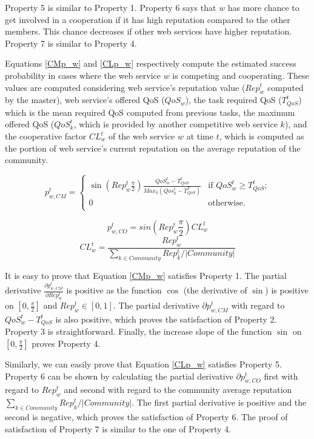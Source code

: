 \documentclass[runningheads,a4paper]{llncs}
\begin{document}
\noindent Property 5 is similar to Property 1. Property 6 says
that $w$ has more chance to get involved in a cooperation if it
has high reputation compared to the other members. This chance
decreases if other web services have higher reputation. Property 7
is similar to Property 4.

Equations  \ref{CMp_w} and \ref{CLp_w} respectively compute the
estimated success probability in cases where the web service $w$
is competing and cooperating. These values are computed
considering web service's reputation value ($Rep^t_w$ computed by
the master), web service's offered QoS ($QoS_w$), the task
required QoS ($T_{QoS}^t$) which is the mean required QoS computed
from previous tasks, the maximum offered QoS ($QoS_k^t$, which is
provided by another competitive web service $k$), and the
cooperative factor $CL_w^t$ of the web service $w$ at time $t$,
which is computed as the portion of web service's current
reputation on the average reputation of the community.

\begin{equation} \label{CMp_w}
p_{w,CM}^t = \begin{cases}
\sin(Rep^t_w\frac{\pi}{2})\frac{QoS_w^t-T_{QoS}^t}{Max_k(Qos_k^t-T_{QoS}^T)} & \text{if $QoS_w^t\geq T_{QoS}^t$;}\\
0 & \text{otherwise.}\\
\end{cases}
\end{equation}

\begin{equation}\label{CLp_w}
p_{w,CO}^t=sin(Rep^t_w\frac{\pi}{2})CL_w^t
\end{equation}
\begin{equation*}
CL_w^t=\frac{Rep^t_w}{\sum_{k\in Community}Rep^t_k/|Community|}
\end{equation*}



It is easy to prove that Equation  \ref{CMp_w} satisfies Property
1. The partial derivative $\frac{\partial p_{w,CM}^t}{\partial
Rep^t_w}$ is positive as the function $\cos$ (the derivative of
$\sin$) is positive on $[0, \frac{\pi}{2}]$ and $Rep^t_w \in [0,
1]$. The partial derivative $\partial p_{w,CM}^t$ with regard to
$QoS_w^t - T_{QoS}^t$ is also positive, which proves the
satisfaction of Property 2. Property 3 is straightforward.
Finally, the increase slope of the function $\sin$ on $[0,
\frac{\pi}{2}]$ proves Property 4.

Similarly, we can easily prove that Equation \ref{CLp_w} satisfies
Property 5. Property 6 can be shown by calculating the partial
derivative $\partial p_{w,CO}^t$ first with regard to $Rep^t_w$
and second with regard to the community average reputation
$\sum_{k\in Community}Rep^t_k/|Community|$. The first partial
derivative is positive and the second is negative, which proves
the satisfaction of Property 6. The proof of satisfaction of
Property 7 is similar to the one of Property 4.
\end{document}
